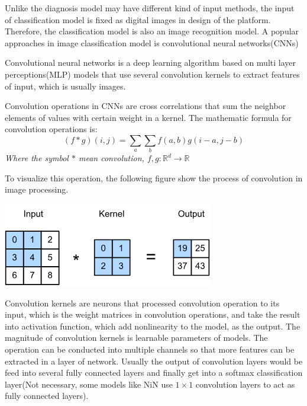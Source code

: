                     Unlike the diagnosis model may have different kind of input methods, the input of classification model is fixed as digital images in design of the platform. Therefore, the classification model is also an image recognition model. A popular approaches in image classification model is convolutional neural networks(CNNs)

                    Convolutional neural networks is a deep learning algorithm based on multi layer perceptions(MLP) models that use several convolution kernels to extract features of input, which is usually images.

                    Convolution operations in CNNs are cross correlations that sum the neighbor elements of values with certain weight in a kernel. The mathematic formula for convolution operations is\cite{zhang2023dive}:
                    \[
                        (f * g)(i, j) = \sum_a\sum_b f(a, b) g(i-a, j-b)
                    \]
                    \textit{Where the symbol $*$ mean convolution, $f, g: \mathbb{R}^d \to \mathbb{R}$ }

                    To visualize this operation, the following figure show the process of convolution in image processing.
                    \begin{Figure}
                        \centering
                        \includegraphics[width=0.8\linewidth]{Image/Conv.png}
                    \end{Figure}

                    Convolution kernels are neurons that processed convolution operation to its input, which is the weight matrices in convolution operations, and take the result into activation function, which add nonlinearity to the model, as the output. The magnitude of convolution kernels is learnable parameters of models. The operation can be conducted into multiple channels so that more features can be extracted in a layer of network. Usually the output of convolution layers would be feed into several fully connected layers and finally get into a softmax classification layer(Not necessary, some models like NiN use $1\times1$ convolution layers to act as fully connected layers).

